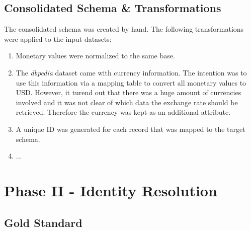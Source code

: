 \documentclass[11pt,titlepage,oneside,openany]{book}
\begin{document}
\section{Consolidated Schema \& Transformations}

The consolidated schema was created by hand. The following transformations were applied to the input datasets:\begin{enumerate}
	\item Monetary values were normalized to the same base.
	\item The \textit{dbpedia} dataset came with currency information. The intention was to use this information via a mapping table to convert all monetary values to USD. However, it turend out that there was a huge amount of currencies involved and it was not clear of which data the exchange rate should be retrieved. Therefore the currency was kept as an additional attribute.
	\item A unique ID was generated for each record that was mapped to the target schema.
	\item ...
\end{enumerate} 


\chapter{Phase II - Identity Resolution}
\label{cha:identity-resolution}

\section{Gold Standard}
\label{sec:gold-standard-IR}
\end{document}
